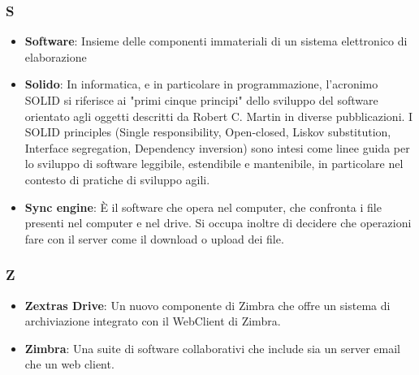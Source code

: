 \subsubsection*{S}
\begin{itemize}
    \item \textbf{Software}: Insieme delle componenti immateriali di un sistema elettronico di elaborazione
    \item \textbf{Solido}: In informatica, e in particolare in programmazione, l'acronimo SOLID si riferisce ai "primi cinque principi" dello sviluppo del software orientato agli oggetti descritti da Robert C. Martin in diverse pubblicazioni. I SOLID principles (Single responsibility, Open-closed, Liskov substitution, Interface segregation, Dependency inversion) sono intesi come linee guida per lo sviluppo di software leggibile, estendibile e mantenibile, in particolare nel contesto di pratiche di sviluppo agili.
    \item \textbf{Sync engine}: È il software che opera nel computer, che confronta i file presenti nel computer e nel drive. Si occupa inoltre di decidere che operazioni fare con il server come il download o upload dei file.
\end{itemize}

\subsubsection*{Z}
\begin{itemize}
    \item \textbf{Zextras Drive}: Un nuovo componente di Zimbra che offre un sistema di archiviazione integrato con il WebClient di Zimbra. 
    \item \textbf{Zimbra}: Una suite di software collaborativi che include sia un server email che un web client.
\end{itemize}